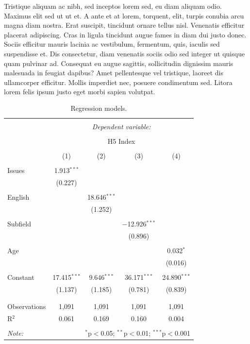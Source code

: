 \documentclass[
  12,
]{article}
\begin{document}
Tristique aliquam ac nibh, sed inceptos lorem sed, eu diam aliquam odio.
Maximus elit sed ut ut et. A ante et at lorem, torquent, elit, turpis
conubia arcu magna diam nostra. Erat suscipit, tincidunt ornare tellus
nisl. Venenatis efficitur placerat adipiscing. Cras in ligula tincidunt
augue fames in diam dui justo donec. Sociis efficitur mauris lacinia ac
vestibulum, fermentum, quis, iaculis sed suspendisse et. Dis
consectetur, diam venenatis sociis odio sed integer ut quisque quam
pulvinar ad. Consequat eu augue sagittis, sollicitudin dignissim mauris
malesuada in feugiat dapibus? Amet pellentesque vel tristique, laoreet
dis ullamcorper efficitur. Mollis imperdiet nec, posuere condimentum
sed. Litora lorem felis ipsum justo eget morbi sapien volutpat.

\begin{table}[!htbp] \centering 
  \caption{Regression models.} 
  \label{r_table} 
\begin{tabular}{@{\extracolsep{5pt}}lcccc} 
\\[-1.8ex]\hline 
\hline \\[-1.8ex] 
 & \multicolumn{4}{c}{\textit{Dependent variable:}} \\ 
\cline{2-5} 
\\[-1.8ex] & \multicolumn{4}{c}{H5 Index} \\ 
\\[-1.8ex] & (1) & (2) & (3) & (4)\\ 
\hline \\[-1.8ex] 
 Issues & 1.913$^{***}$ &  &  &  \\ 
  & (0.227) &  &  &  \\ 
  & & & & \\ 
 English &  & 18.646$^{***}$ &  &  \\ 
  &  & (1.252) &  &  \\ 
  & & & & \\ 
 Subfield &  &  & $-$12.926$^{***}$ &  \\ 
  &  &  & (0.896) &  \\ 
  & & & & \\ 
 Age &  &  &  & 0.032$^{*}$ \\ 
  &  &  &  & (0.016) \\ 
  & & & & \\ 
 Constant & 17.415$^{***}$ & 9.646$^{***}$ & 36.171$^{***}$ & 24.890$^{***}$ \\ 
  & (1.137) & (1.185) & (0.781) & (0.839) \\ 
  & & & & \\ 
\hline \\[-1.8ex] 
Observations & 1,091 & 1,091 & 1,091 & 1,091 \\ 
R$^{2}$ & 0.061 & 0.169 & 0.160 & 0.004 \\ 
\hline 
\hline \\[-1.8ex] 
\textit{Note:}  & \multicolumn{4}{r}{$^{*}$p$<$0.05; $^{**}$p$<$0.01; $^{***}$p$<$0.001} \\ 
\end{tabular} 
\end{table}
\end{document}

